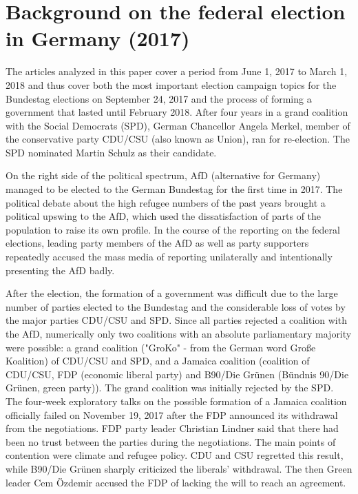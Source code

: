 \documentclass[12pt,a4paper,notitlepage]{article}
\begin{document}
\section{Background on the federal election in Germany (2017)}\label{ch_elections}

The articles analyzed in this paper cover a period from June 1, 2017 to March 1, 2018 and thus cover both the most important election campaign topics for the Bundestag elections on September 24, 2017 and the process of forming a government that lasted until February 2018. After four years in a grand coalition with the Social Democrats (SPD), German Chancellor Angela Merkel, member of the conservative party CDU/CSU (also known as Union), ran for re-election. The SPD nominated Martin Schulz as their candidate. 

On the right side of the political spectrum, AfD (alternative for Germany) managed to be elected to the German Bundestag for the first time in 2017. The political debate about the high refugee numbers of the past years brought a political upswing to the AfD, which used the dissatisfaction of parts of the population to raise its own profile. In the course of the reporting on the federal elections, leading party members of the AfD as well as party supporters repeatedly accused the mass media of reporting unilaterally and intentionally presenting the AfD badly.

After the election, the formation of a government was difficult due to the large number of parties elected to the Bundestag and the considerable loss of votes by the major parties CDU/CSU and SPD. Since all parties rejected a coalition with the AfD, numerically only two coalitions with an absolute parliamentary majority were possible: a grand coalition ("GroKo" - from the German word Große Koalition) of CDU/CSU and SPD, and a Jamaica coalition (coalition of CDU/CSU, FDP (economic liberal party) and B90/Die Grünen (Bündnis 90/Die Grünen, green party)). The grand coalition was initially rejected by the SPD. The four-week exploratory talks on the possible formation of a Jamaica coalition officially failed on November 19, 2017 after the FDP announced its withdrawal from the negotiations. FDP party leader Christian Lindner said that there had been no trust between the parties during the negotiations. The main points of contention were climate and refugee policy. CDU and CSU regretted this result, while B90/Die Grünen sharply criticized the liberals' withdrawal. The then Green leader Cem Özdemir accused the FDP of lacking the will to reach an agreement.
\end{document}
